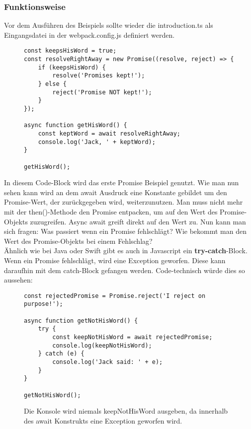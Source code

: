 \subsubsection{Funktionsweise}

\noindent
Vor dem Ausführen des Beispiels sollte wieder die introduction.ts als Eingangsdatei in der webpack.config.js definiert werden.

\begin{figure}[H]
\begin{lstlisting}
const keepsHisWord = true;
const resolveRightAway = new Promise((resolve, reject) => {
    if (keepsHisWord) {
        resolve('Promises kept!');
    } else {
        reject('Promise NOT kept!');
    }
});

async function getHisWord() {
    const keptWord = await resolveRightAway;
    console.log('Jack, ' + keptWord);
}

getHisWord();
\end{lstlisting}
\end{figure}

\noindent
In diesem Code-Block wird das erste Promise Beispiel genutzt. Wie man nun sehen kann wird an dem await Ausdruck eine Konstante gebildet um den Promise-Wert, der zurückgegeben wird, weiterzunutzen. Man muss nicht mehr mit der then()-Methode den Promise entpacken, um auf den Wert des Promise-Objekts zuzugreifen. Async await greift direkt auf den Wert zu. Nun kann man sich fragen: Was passiert wenn ein Promise fehlschlägt? Wie bekommt man den Wert des Promise-Objekts bei einem Fehlschlag? \\

\noindent
Ähnlich wie bei Java oder Swift gibt es auch in Javascript ein \textbf{try-catch}-Block. Wenn ein Promise fehlschlägt, wird eine Exception geworfen.\cite{async-await-heise} Diese kann daraufhin mit dem catch-Block gefangen werden. Code-technisch würde dies so aussehen:

\begin{figure}[H]
\begin{lstlisting}
const rejectedPromise = Promise.reject('I reject on purpose!');

async function getNotHisWord() {
    try {
        const keepNotHisWord = await rejectedPromise;
        console.log(keepNotHisWord);
    } catch (e) {
        console.log('Jack said: ' + e);
    }
}

getNotHisWord();
\end{lstlisting}
\caption{Die Konsole wird niemals keepNotHisWord ausgeben, da innerhalb des await Konstrukts eine Exception geworfen wird.}
\end{figure}

